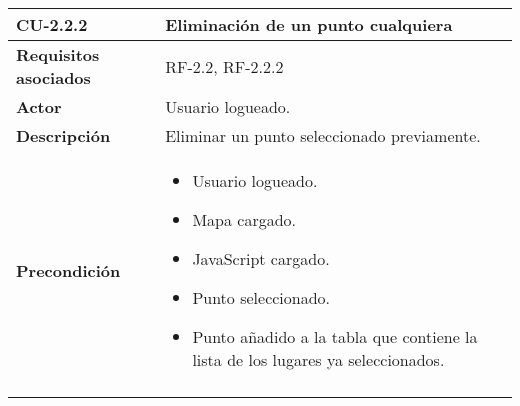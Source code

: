 \begin{longtable}[H]{@{}l|l@{}}
	\toprule
	\begin{minipage}[b]{0.23\columnwidth}\raggedright\strut
		\textbf{CU-2.2.2}\strut
	\end{minipage} & \begin{minipage}[b]{0.71\columnwidth}\raggedright\strut
		\textbf{Eliminación de un punto cualquiera}\strut
	\end{minipage}\tabularnewline
	\toprule
	\endhead
	\begin{minipage}[t]{0.23\columnwidth}\raggedright\strut
		\textbf{Requisitos asociados}\strut
	\end{minipage} & \begin{minipage}[t]{0.71\columnwidth}\raggedright\strut
		RF-2.2, RF-2.2.2\strut
	\end{minipage}\tabularnewline
	\midrule
	\begin{minipage}[t]{0.23\columnwidth}\raggedright\strut
		\textbf{Actor}\strut
	\end{minipage} & \begin{minipage}[t]{0.71\columnwidth}\raggedright\strut
		Usuario logueado.\strut
	\end{minipage}\tabularnewline
	\midrule
	\begin{minipage}[t]{0.23\columnwidth}\raggedright\strut
		\textbf{Descripción}\strut
	\end{minipage} & \begin{minipage}[t]{0.71\columnwidth}\raggedright\strut
		Eliminar un punto seleccionado previamente.\strut
	\end{minipage}\tabularnewline
	\midrule
	\begin{minipage}[t]{0.23\columnwidth}\raggedright\strut
		\textbf{Precondición}\strut
	\end{minipage} & \begin{minipage}[t]{0.71\columnwidth}\raggedright\strut
		\begin{itemize}
			\item Usuario logueado.
			\item Mapa cargado.
			\item JavaScript cargado.
			\item Punto seleccionado.
			\item Punto añadido a la tabla que contiene la lista de los lugares ya seleccionados.
		\end{itemize}
	\end{minipage}\tabularnewline
	\midrule
	\begin{minipage}[t]{0.23\columnwidth}\raggedright\strut

\end{minipage}
\end{longtable}

